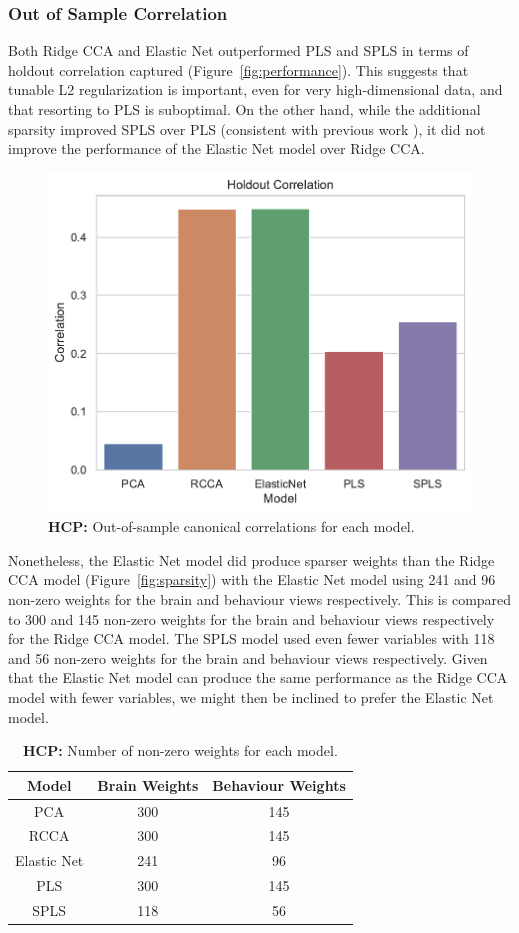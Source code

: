 \subsubsection{Out of Sample Correlation}

Both Ridge CCA and Elastic Net outperformed PLS and SPLS in terms of holdout correlation captured (Figure~\ref{fig:performance}).
This suggests that tunable L2 regularization is important, even for very high-dimensional data, and that resorting to PLS is suboptimal.
On the other hand, while the additional sparsity improved SPLS over PLS (consistent with previous work \cite{monteiro2016multiple}), it did not improve the performance of the Elastic Net model over Ridge CCA\@.

\begin{figure}[h]
    \centering
    \includegraphics[width=0.5\linewidth]{figures/hcp/holdout_correlations}
    \caption{\textbf{HCP:} Out-of-sample canonical correlations for each model.}
\end{figure}

Nonetheless, the Elastic Net model did produce sparser weights than the Ridge CCA model (Figure~\ref{fig:sparsity}) with the Elastic Net model using 241 and 96 non-zero weights for the brain and behaviour views respectively.
This is compared to 300 and 145 non-zero weights for the brain and behaviour views respectively for the Ridge CCA model.
The SPLS model used even fewer variables with 118 and 56 non-zero weights for the brain and behaviour views respectively.
Given that the Elastic Net model can produce the same performance as the Ridge CCA model with fewer variables, we might then be inclined to prefer the Elastic Net model.

\begin{table}[h]
    \centering
    \caption{\textbf{HCP:} Number of non-zero \gls{weights} for each model.}
    \begin{tabular}{|c|c|c|}
        \hline
        Model       & Brain Weights & Behaviour Weights \\
        \hline
        PCA         & 300           & 145               \\
        RCCA        & 300           & 145               \\
        Elastic Net & 241           & 96                \\
        PLS         & 300           & 145               \\
        SPLS        & 118           & 56                \\
        \hline
    \end{tabular}\label{tab:brain-behaviour-weights-hcp}
\end{table}

